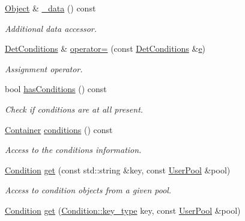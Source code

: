 \begin{DoxyCompactItemize}
\hyperlink{class_d_d4hep_1_1_conditions_1_1_det_conditions_a4c0ad456b1967b5b724894f23ef63dec}{Object} \& \hyperlink{class_d_d4hep_1_1_conditions_1_1_det_conditions_a632e7b8c7b2a10c4e3e82833641c3de6}{\+\_\+data} () const
\begin{DoxyCompactList}\small\item\em Additional data accessor. \end{DoxyCompactList}\item 
\hyperlink{class_d_d4hep_1_1_conditions_1_1_det_conditions}{Det\+Conditions} \& \hyperlink{class_d_d4hep_1_1_conditions_1_1_det_conditions_aea710da17ca864a0528a7b3503c16d2d}{operator=} (const \hyperlink{class_d_d4hep_1_1_conditions_1_1_det_conditions}{Det\+Conditions} \&\hyperlink{_volumes_8cpp_a8a9a1f93e9b09afccaec215310e64142}{e})
\begin{DoxyCompactList}\small\item\em Assignment operator. \end{DoxyCompactList}\item 
bool \hyperlink{class_d_d4hep_1_1_conditions_1_1_det_conditions_abdfdb48f7369a195f3d44cb7a1f88632}{has\+Conditions} () const
\begin{DoxyCompactList}\small\item\em Check if conditions are at all present. \end{DoxyCompactList}\item 
\hyperlink{class_d_d4hep_1_1_conditions_1_1_container}{Container} \hyperlink{class_d_d4hep_1_1_conditions_1_1_det_conditions_aedbbaf4a4f7e71dc7d6cad819dacad7e}{conditions} () const
\begin{DoxyCompactList}\small\item\em Access to the conditions information. \end{DoxyCompactList}\item 
\hyperlink{class_d_d4hep_1_1_conditions_1_1_condition}{Condition} \hyperlink{class_d_d4hep_1_1_conditions_1_1_det_conditions_aae12a60c145a9aee9dc098db5fd8eb7b}{get} (const std\+::string \&key, const \hyperlink{class_d_d4hep_1_1_conditions_1_1_user_pool}{User\+Pool} \&pool)
\begin{DoxyCompactList}\small\item\em Access to condition objects from a given pool. \end{DoxyCompactList}\item 
\hyperlink{class_d_d4hep_1_1_conditions_1_1_condition}{Condition} \hyperlink{class_d_d4hep_1_1_conditions_1_1_det_conditions_a4c19cc72b89329e39cd0123229cba3d0}{get} (\hyperlink{class_d_d4hep_1_1_conditions_1_1_condition_a7528efa762e8cc072ef80ea67c3531f9}{Condition\+::key\+\_\+type} key, const \hyperlink{class_d_d4hep_1_1_conditions_1_1_user_pool}{User\+Pool} \&pool)

\end{DoxyCompactItemize}
